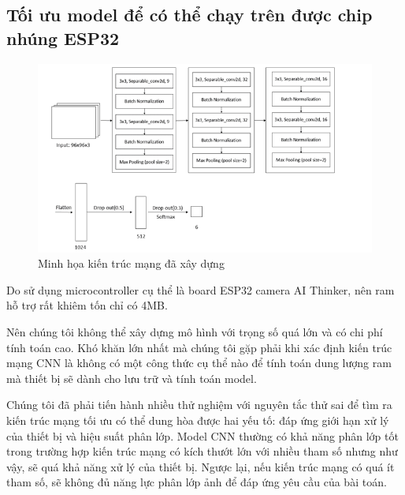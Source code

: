 \subsection{Tối ưu model để có thể chạy trên được chip nhúng ESP32}
\begin{figure}[ht]
    \centering
    \includegraphics[width=\linewidth]{images/Quanh/ktmang.png}
    \caption{Minh họa kiến trúc mạng đã xây dựng}
    \label{fig:kientrucmang}
\end{figure}

Do sử dụng microcontroller cụ thể là board ESP32 camera AI Thinker, nên ram hỗ trợ rất khiêm tốn chỉ có 4MB. 

Nên chúng tôi không thể xây dựng mô hình với trọng số quá lớn và có chi phí tính toán cao. Khó khăn lớn nhất mà chúng tôi gặp phải khi xác định kiến trúc mạng CNN là không có một công thức cụ thể nào để tính toán dung lượng ram mà thiết bị sẽ dành cho lưu trữ và tính toán model.

Chúng tôi đã phải tiến hành nhiều thử nghiệm với nguyên tắc thử sai để tìm ra kiến trúc mạng tối ưu có thể dung hòa được hai yếu tố: đáp ứng giới hạn xử lý của thiết bị và hiệu suất phân lớp. Model CNN thường có khả năng phân lớp tốt trong trường hợp kiến trúc mạng có kích thướt lớn với nhiều tham số nhưng như vậy, sẽ quá khả năng xử lý của thiết bị. Ngược lại, nếu kiến trúc mạng có quá ít tham số, sẽ không đủ năng lực phân lớp ảnh để đáp ứng yêu cầu của bài toán.



